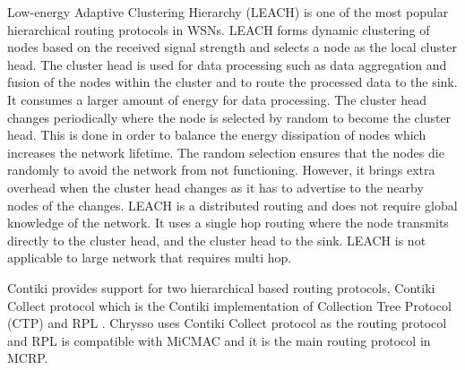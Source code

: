 

Low-energy Adaptive Clustering Hierarchy (LEACH) is one of the most popular hierarchical routing protocols in WSNs. LEACH forms dynamic clustering of nodes based on the received signal strength and selects a node as the local cluster head. The cluster head is used for data processing such as data aggregation and fusion of the nodes within the cluster and to route the processed data to the sink. It consumes a larger amount of energy for data processing. The cluster head changes periodically where the node is selected by random to become the cluster head. This is done in order to balance the energy dissipation of nodes which increases the network lifetime. The random selection ensures that the nodes die randomly to avoid the network from not functioning. However, it brings extra overhead when the cluster head changes as it has to advertise to the nearby nodes of the changes. LEACH is a distributed routing and does not require global knowledge of the network. It uses a single hop routing where the node transmits directly to the cluster head, and the cluster head to the sink. LEACH is not applicable to large network that requires multi hop.

Contiki provides support for two hierarchical based routing protocols, Contiki Collect protocol which is the Contiki implementation of Collection Tree Protocol (CTP) \cite{ctp, ctptep} and RPL \cite{winter2012rpl}. Chrysso uses Contiki Collect protocol as the routing protocol and RPL is compatible with MiCMAC and it is the main routing protocol in MCRP.

